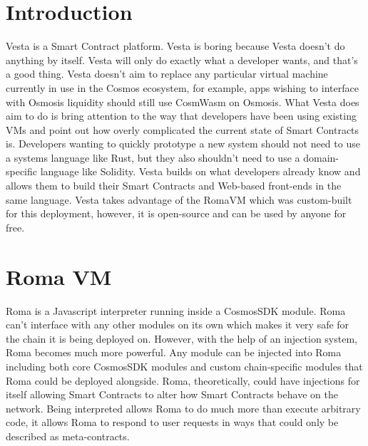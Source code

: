 \documentclass[a4paper]{article}
\begin{document}
\section{Introduction}\label{sec:introduction}
Vesta is a Smart Contract platform.
Vesta is boring because Vesta doesn't do anything by itself.
Vesta will only do exactly what a developer wants, and that's a good thing.
Vesta doesn't aim to replace any particular virtual machine currently in use in the Cosmos ecosystem, for example, apps wishing to interface with Osmosis liquidity should still use CosmWasm on Osmosis.
What Vesta does aim to do is bring attention to the way that developers have been using existing VMs and point out how overly complicated the current state of Smart Contracts is.
Developers wanting to quickly prototype a new system should not need to use a systems language like Rust, but they also shouldn't need to use a domain-specific language like Solidity.
Vesta builds on what developers already know and allows them to build their Smart Contracts and Web-based front-ends in the same language.
Vesta takes advantage of the RomaVM which was custom-built for this deployment, however, it is open-source and can be used by anyone for free.

\section{Roma VM}\label{sec:roma-vm}
Roma is a Javascript interpreter running inside a CosmosSDK module.
Roma can't interface with any other modules on its own which makes it very safe for the chain it is being deployed on.
However, with the help of an injection system, Roma becomes much more powerful.
Any module can be injected into Roma including both core CosmosSDK modules and custom chain-specific modules that Roma could be deployed alongside.
Roma, theoretically, could have injections for itself allowing Smart Contracts to alter how Smart Contracts behave on the network.
Being interpreted allows Roma to do much more than execute arbitrary code, it allows Roma to respond to user requests in ways that could only be described as meta-contracts.
\end{document}
